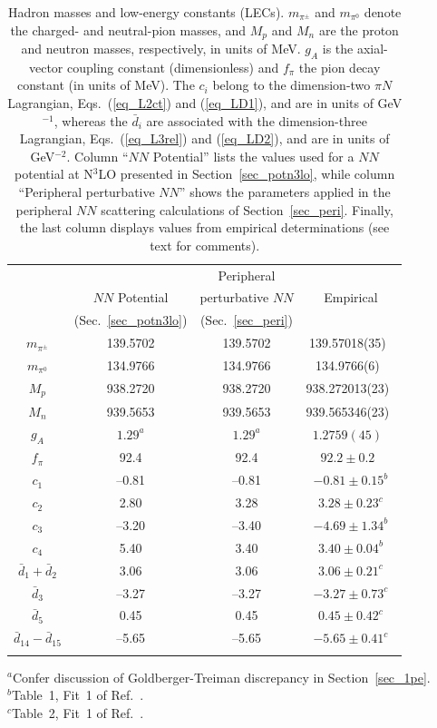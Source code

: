 \documentclass[sort&compress,preprint,3p]{elsarticle}
\begin{document}
\begin{table}[t]
\caption{Hadron masses and
low-energy constants (LECs).
$m_{\pi^\pm}$ and $m_{\pi^0}$ denote the charged- and neutral-pion masses,
and $M_p$ and $M_n$ are the proton and neutron masses, respectively, in units of MeV.
$g_A$ is the axial-vector coupling constant (dimensionless)
and $f_\pi$ the pion decay constant (in units of MeV).
The $c_i$ belong to the dimension-two $\pi N$ Lagrangian,
Eqs.~(\ref{eq_L2ct}) and (\ref{eq_LD1}), and are in units of GeV$^{-1}$,
whereas the $\bar{d}_i$ are associated with the dimension-three
Lagrangian, Eqs.~(\ref{eq_L3rel}) and (\ref{eq_LD2}), and
are in units of GeV$^{-2}$.
Column ``$NN$ Potential'' lists the values
used for a $NN$ potential
at N$^3$LO presented in Section~\ref{sec_potn3lo}, while
column ``Peripheral perturbative $NN$'' shows the parameters applied in the 
peripheral $NN$ scattering calculations of Section~\ref{sec_peri}.
Finally, the last column displays values from empirical
determinations (see text for comments).
\label{tab_LEC}}
\smallskip
\begin{tabular*}{\textwidth}{@{\extracolsep{\fill}}cccc}
\hline
\hline
\noalign{\smallskip}
  &                           & Peripheral           &                \\
  & $NN$ Potential & perturbative $NN$    & Empirical \\
     & (Sec.~\ref{sec_potn3lo}) & (Sec.~\ref{sec_peri}) & \\
\hline
\noalign{\smallskip}
$m_{\pi^\pm}$ & 139.5702 & 139.5702 & 139.57018(35)~\cite{PDG} \\
$m_{\pi^0}$ & 134.9766 & 134.9766 & 134.9766(6)~\cite{PDG} \\
$M_p$    & 938.2720 & 938.2720   & 938.272013(23)~\cite{PDG} \\
$M_n$    & 939.5653 & 939.5653   & 939.565346(23)~\cite{PDG} \\
$g_A$ & $1.29^a$ & $1.29^a$ & $1.2759(45)$~\cite{Liu10} \\
$f_\pi$ & 92.4 & 92.4 & $92.2\pm 0.2$~\cite{PDG} \\
$c_1$ & --0.81 & --0.81 & $-0.81\pm 0.15^b$ \\
$c_2$ & 2.80 & 3.28 & $3.28\pm 0.23^c$ \\
$c_3$ & --3.20 & --3.40 & $-4.69\pm 1.34^b$ \\
$c_4$ & 5.40 & 3.40 & $3.40\pm 0.04^b$ \\
$\bar{d}_1 + \bar{d}_2$ & 3.06 & 3.06 & $3.06\pm 0.21^c$ \\
$\bar{d}_3$ & --3.27 & --3.27 & $-3.27\pm 0.73^c$ \\
$\bar{d}_5$ & 0.45 & 0.45 & $0.45\pm 0.42^c$ \\
$\bar{d}_{14} - \bar{d}_{15}$ & --5.65 & --5.65 & $-5.65\pm 0.41^c$ \\
\hline
\hline
\noalign{\smallskip}
\end{tabular*}
$^a$Confer discussion of Goldberger-Treiman discrepancy in
Section~\ref{sec_1pe}.\\
$^b$Table~1, Fit~1 of Ref.~\cite{BM00}.\\
$^c$Table~2, Fit~1 of Ref.~\cite{FMS98}.
\end{table}
\end{document}
